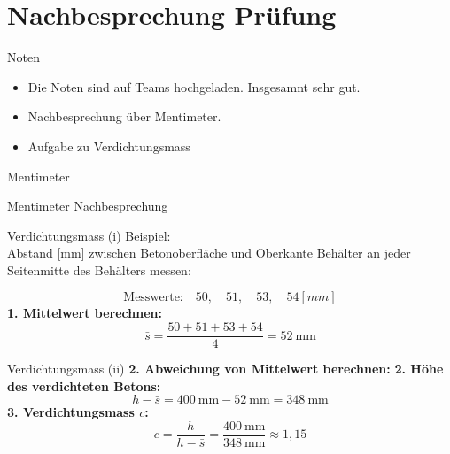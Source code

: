 \section{Nachbesprechung Prüfung}
\BlueSectionSlide

\begin{frame}{Noten}
    \begin{itemize}
        \item[\textbullet] Die Noten sind auf Teams hochgeladen. Insgesamnt sehr gut.
        \item[\textbullet] Nachbesprechung über Mentimeter. 
        \item[\textbullet] Aufgabe zu Verdichtungsmass
    \end{itemize}
\end{frame}

\begin{frame}{Mentimeter}

    \href{https://www.menti.com/alg3er8i4yvp}{Mentimeter Nachbesprechung}
\end{frame}



\begin{frame}{Verdichtungsmass (i)}
Beispiel: \\
Abstand [mm] zwischen Betonoberfläche und Oberkante Behälter an jeder Seitenmitte des Behälters messen:

\vspace{0.3em}
\[
\text{Messwerte:} \quad 50, \quad 51, \quad 53, \quad 54 [mm]
\]
\vspace{0.3em}
\pause
\vspace{1em}
\textbf{1. Mittelwert berechnen:}
\[
\bar{s} = \frac{50 + 51 + 53 + 54}{4} = \SI{52}{\milli\meter}
\]

\end{frame}

\begin{frame}{Verdichtungsmass (ii)}
\textbf{2. Abweichung von Mittelwert berechnen:}
\textbf{2. Höhe des verdichteten Betons:}
\[
h - \bar{s} = \SI{400}{\milli\meter} - \SI{52}{\milli\meter} = \SI{348}{\milli\meter}
\]
\pause
\vspace{1em}
\textbf{3. Verdichtungsmass \(c\):}
\[
c = \frac{h}{h - \bar{s}} = \frac{\SI{400}{\milli\meter}}{\SI{348}{\milli\meter}} \approx 1{,}15
\]
\end{frame}

